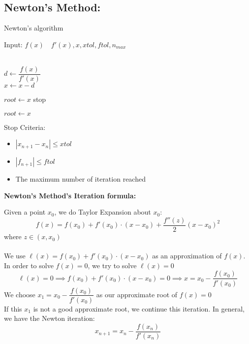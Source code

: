 \documentclass [9 pt]{article}
\theoremstyle{definition}
\begin{document}
\subsection*{Newton's Method:}
\begin{algorithm}
\caption{Newton's algorithm}

\begin{algorithmic}[1]
\State Input: $f(x) \quad f'(x), x, xtol, ftol, n_{max} $ 
\State {}

	\\
		\State $d \gets \dfrac{f(x)}{ f'(x)} $ 
		\\
		\State $x \gets x - d$
		
			\State $root \gets x$
			\State stop
		\EndIf
	\\
	\EndFor	
	
	\State $root \gets x$


\end{algorithmic}
\end{algorithm}


Stop Criteria:
\begin{itemize}
	\item $|x_{n+1} - x_n| \leq xtol$
	\item $|f_{n+1} | \leq ftol$
	\item The maximum number of iteration reached
\end{itemize}


\textbf{Newton's Method's Iteration formula:}
\begin{mdframed}
	Given a point $x_0$, we do Taylor Expansion about $x_0$:
	$$f(x) = f(x_0) + f'(x_0)\cdot ( x - x_0) + \dfrac{f''(z)}{2} (x - x_0)^2 $$
	where $z \in (x, x_0)$\\
	\\
	We use $\ell(x) = f(x_0) + f'(x_0)\cdot ( x - x_0)$ as an approximation of $f(x)$. In order to solve $f(x) = 0$, we try to solve $\ell(x) = 0$
	$$\ell(x) = 0 \implies  f(x_0) + f'(x_0)\cdot ( x - x_0) = 0 \implies 
	x = x_0 - \dfrac{f(x_0)}{f'(x_0)}  $$
	We choose $x_1 = x_0 - \dfrac{f(x_0)}{f'(x_0)}   $ as our approximate root of $f(x) = 0$\\
	If this $x_1$ is not a good approximate root, we continue this iteration. In general, we have the Newton iteration:
	$$x_{n+1} = x_n - \dfrac{f(x_n)}{f'(x_n)}$$
\end{mdframed}
\end{document}
